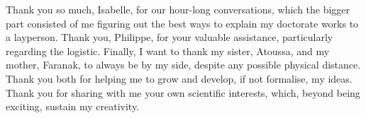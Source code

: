 Thank you so much, Isabelle, for our hour-long conversations,
which the bigger part consisted of me figuring out the best ways
to explain my doctorate works to a layperson.
Thank you, Philippe, for your valuable assistance, particularly regarding the logistic.
Finally, I want to thank my sister, Atoussa, and my mother, Faranak,
to always be by my side, despite any possible physical distance.
Thank you both for helping me to grow and develop,
if not formalise, my ideas.
Thank you for sharing with me your own scientific interests,
which, beyond being exciting, sustain my creativity.


